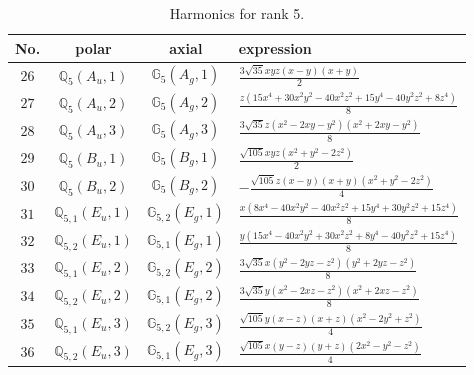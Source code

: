 \documentclass[fleqn,8pt,landscape]{jsarticle}
\begin{document}
\begin{table}[ht!]
\begin{center}
\caption{Harmonics for rank 5.}
\renewcommand{\arraystretch}{1.3}
\begin{tabular}{cccl} \hline \hline
No. & polar & axial & expression \\ \hline
$ 26 $ & $ \mathbb{Q}_{5}(A_{u},1) $ & $ \mathbb{G}_{5}(A_{g},1) $ & $ \frac{3 \sqrt{35} x y z \left(x - y\right) \left(x + y\right)}{2} $ \\
$ 27 $ & $ \mathbb{Q}_{5}(A_{u},2) $ & $ \mathbb{G}_{5}(A_{g},2) $ & $ \frac{z \left(15 x^{4} + 30 x^{2} y^{2} - 40 x^{2} z^{2} + 15 y^{4} - 40 y^{2} z^{2} + 8 z^{4}\right)}{8} $ \\
$ 28 $ & $ \mathbb{Q}_{5}(A_{u},3) $ & $ \mathbb{G}_{5}(A_{g},3) $ & $ \frac{3 \sqrt{35} z \left(x^{2} - 2 x y - y^{2}\right) \left(x^{2} + 2 x y - y^{2}\right)}{8} $ \\
$ 29 $ & $ \mathbb{Q}_{5}(B_{u},1) $ & $ \mathbb{G}_{5}(B_{g},1) $ & $ \frac{\sqrt{105} x y z \left(x^{2} + y^{2} - 2 z^{2}\right)}{2} $ \\
$ 30 $ & $ \mathbb{Q}_{5}(B_{u},2) $ & $ \mathbb{G}_{5}(B_{g},2) $ & $ - \frac{\sqrt{105} z \left(x - y\right) \left(x + y\right) \left(x^{2} + y^{2} - 2 z^{2}\right)}{4} $ \\
$ 31 $ & $ \mathbb{Q}_{5,1}(E_{u},1) $ & $ \mathbb{G}_{5,2}(E_{g},1) $ & $ \frac{x \left(8 x^{4} - 40 x^{2} y^{2} - 40 x^{2} z^{2} + 15 y^{4} + 30 y^{2} z^{2} + 15 z^{4}\right)}{8} $ \\
$ 32 $ & $ \mathbb{Q}_{5,2}(E_{u},1) $ & $ \mathbb{G}_{5,1}(E_{g},1) $ & $ \frac{y \left(15 x^{4} - 40 x^{2} y^{2} + 30 x^{2} z^{2} + 8 y^{4} - 40 y^{2} z^{2} + 15 z^{4}\right)}{8} $ \\
$ 33 $ & $ \mathbb{Q}_{5,1}(E_{u},2) $ & $ \mathbb{G}_{5,2}(E_{g},2) $ & $ \frac{3 \sqrt{35} x \left(y^{2} - 2 y z - z^{2}\right) \left(y^{2} + 2 y z - z^{2}\right)}{8} $ \\
$ 34 $ & $ \mathbb{Q}_{5,2}(E_{u},2) $ & $ \mathbb{G}_{5,1}(E_{g},2) $ & $ \frac{3 \sqrt{35} y \left(x^{2} - 2 x z - z^{2}\right) \left(x^{2} + 2 x z - z^{2}\right)}{8} $ \\
$ 35 $ & $ \mathbb{Q}_{5,1}(E_{u},3) $ & $ \mathbb{G}_{5,2}(E_{g},3) $ & $ \frac{\sqrt{105} y \left(x - z\right) \left(x + z\right) \left(x^{2} - 2 y^{2} + z^{2}\right)}{4} $ \\
$ 36 $ & $ \mathbb{Q}_{5,2}(E_{u},3) $ & $ \mathbb{G}_{5,1}(E_{g},3) $ & $ \frac{\sqrt{105} x \left(y - z\right) \left(y + z\right) \left(2 x^{2} - y^{2} - z^{2}\right)}{4} $ \\
 \hline \hline
\end{tabular}
\end{center}
\end{table}
\end{document}
